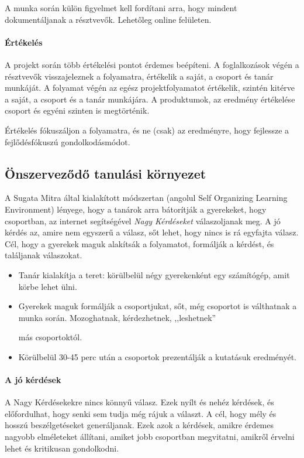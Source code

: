 A munka során külön figyelmet kell fordítani arra, hogy mindent dokumentáljanak
a résztvevők. Lehetőleg online felületen.

\paragraph{Értékelés} A projekt során több értékelési pontot érdemes beépíteni.
A foglalkozások végén a résztvevők visszajeleznek a folyamatra, értékelik a
saját, a csoport és tanár munkáját. A folyamat végén az egész projektfolyamatot
értékelik, szintén kitérve a saját, a csoport és a tanár munkájára. A
produktumok, az eredmény értékelése csoport és egyéni szinten is megtörténik.

Értékelés fókuszáljon a folyamatra, és ne (csak) 
az eredményre, hogy fejlessze a fejlődésfókuszú gondolkodásmódot.\citep{growthmindset}


\subsection{Önszerveződő tanulási környezet}
A Sugata Mitra által kialakított módszertan (angolul Self Organizing Learning
Environment) lényege, hogy a tanárok arra
bátorítják a gyerekeket, hogy csoportban, az internet segítségével \emph{Nagy
Kérdéseket} válaszoljanak meg. A jó kérdés az, amire nem egyszerű a válasz, sőt
lehet, hogy nincs is rá egyfajta válasz. Cél, hogy a gyerekek maguk alakítsák
a folyamatot, formálják a kérdést, és találjanak válaszokat.

\begin{itemize}
      \item Tanár kialakítja a teret: körülbelül négy gyerekenként egy
            számítógép,
            amit körbe lehet ülni.
      \item Gyerekek maguk formálják a csoportjukat, sőt, még csoportot is
            válthatnak a munka során. Mozoghatnak, kérdezhetnek, ,,leshetnek''
            
            más
            csoportoktól.
      \item Körülbelül 30-45 perc után a csoportok prezentálják a kutatásuk
            eredményét.
\end{itemize}

\paragraph{A jó kérdések}
A Nagy Kérdésekekre nincs könnyű válasz. Ezek nyílt és nehéz kérdések, és
előfordulhat, hogy senki sem tudja még rájuk a választ. A cél, hogy mély és hosszú
beszélgetéseket generáljanak. Ezek azok a kérdések, amikre érdemes
nagyobb elméleteket állítani, amiket jobb csoportban megvitatni, amikről
érvelni lehet és kritikusan gondolkodni.

